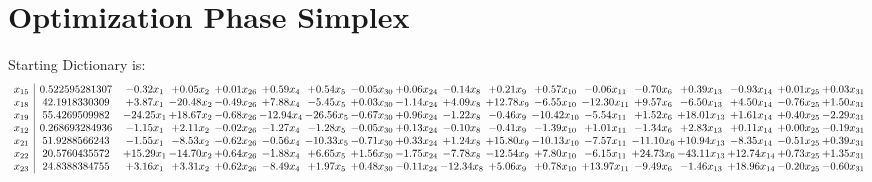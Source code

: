 \documentclass[9pt]{article}
\begin{document}
\section{Optimization Phase Simplex}
Starting Dictionary is:
\[\begin{array}{c| c c@{\hskip 2pt} c@{\hskip 2pt} c@{\hskip 2pt} c@{\hskip 2pt} c@{\hskip 2pt} c@{\hskip 2pt} c@{\hskip 2pt} c@{\hskip 2pt} c@{\hskip 2pt} c@{\hskip 2pt} c@{\hskip 2pt} c@{\hskip 2pt} c@{\hskip 2pt} c@{\hskip 2pt} c@{\hskip 2pt} c@{\hskip 2pt} }
 x_{15}   &  0.522595281307 & -0.32 x_{1} & +  0.05 x_{2} & +  0.01 x_{26} & +  0.59 x_{4} & +  0.54 x_{5} & -0.05 x_{30} & +  0.06 x_{24} & -0.14 x_{8} & +  0.21 x_{9} & +  0.57 x_{10} & -0.06 x_{11} & -0.70 x_{6} & +  0.39 x_{13} & -0.93 x_{14} & +  0.01 x_{25} & +  0.03 x_{31}\\
 x_{18}   &  42.1918330309 & +  3.87 x_{1} & -20.48 x_{2} & -0.49 x_{26} & +  7.88 x_{4} & -5.45 x_{5} & +  0.03 x_{30} & -1.14 x_{24} & +  4.09 x_{8} & + 12.78 x_{9} & -6.55 x_{10} & -12.30 x_{11} & +  9.57 x_{6} & -6.50 x_{13} & +  4.50 x_{14} & -0.76 x_{25} & +  1.50 x_{31}\\
 x_{19}   &  55.4269509982 & -24.25 x_{1} & + 18.67 x_{2} & -0.68 x_{26} & -12.94 x_{4} & -26.56 x_{5} & -0.67 x_{30} & +  0.96 x_{24} & -1.22 x_{8} & -0.46 x_{9} & -10.42 x_{10} & -5.54 x_{11} & +  1.52 x_{6} & + 18.01 x_{13} & +  1.61 x_{14} & +  0.40 x_{25} & -2.29 x_{31}\\
 x_{12}   &  0.268693284936 & -1.15 x_{1} & +  2.11 x_{2} & -0.02 x_{26} & -1.27 x_{4} & -1.28 x_{5} & -0.05 x_{30} & +  0.13 x_{24} & -0.10 x_{8} & -0.41 x_{9} & -1.39 x_{10} & +  1.01 x_{11} & -1.34 x_{6} & +  2.83 x_{13} & +  0.11 x_{14} & +  0.00 x_{25} & -0.19 x_{31}\\
 x_{21}   &  51.9288566243 & -1.55 x_{1} & -8.53 x_{2} & -0.62 x_{26} & -0.56 x_{4} & -10.33 x_{5} & -0.71 x_{30} & +  0.33 x_{24} & +  1.24 x_{8} & + 15.80 x_{9} & -10.13 x_{10} & -7.57 x_{11} & -11.10 x_{6} & + 10.94 x_{13} & -8.35 x_{14} & -0.51 x_{25} & +  0.39 x_{31}\\
 x_{22}   &  20.5760435572 & + 15.29 x_{1} & -14.70 x_{2} & +  0.64 x_{26} & -1.88 x_{4} & +  6.65 x_{5} & +  1.56 x_{30} & -1.75 x_{24} & -7.78 x_{8} & -12.54 x_{9} & +  7.80 x_{10} & -6.15 x_{11} & + 24.73 x_{6} & -43.11 x_{13} & + 12.74 x_{14} & +  0.73 x_{25} & +  1.35 x_{31}\\
 x_{23}   &  24.8388384755 & +  3.16 x_{1} & +  3.31 x_{2} & +  0.62 x_{26} & -8.49 x_{4} & +  1.97 x_{5} & +  0.48 x_{30} & -0.11 x_{24} & -12.34 x_{8} & +  5.06 x_{9} & +  0.78 x_{10} & + 13.97 x_{11} & -9.49 x_{6} & -1.46 x_{13} & + 18.96 x_{14} & -0.20 x_{25} & -0.60 x_{31}\\

\end{array}\]
\end{document}
